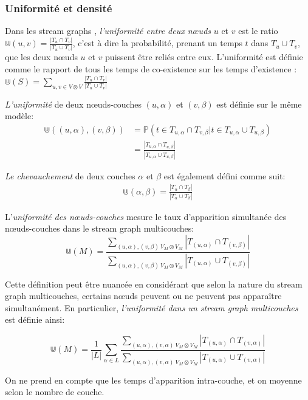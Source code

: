 \documentclass[11pt,a4paper]{article}
\theoremstyle{definition}
\theoremstyle{remark}
\theoremstyle{remark}
\def \stgm {stream graph multicouches}
\def \stgs {stream graphs}
\begin{document}
	\subsubsection{Uniformité et densité}
	
	Dans les \stgs{} \cite{stream}, {\em l'uniformité entre deux nœuds} $u$ et $v$ est le ratio $\Cup (u,v) = \frac{|T_u\cap T_v|}{|T_u \cup T_v|}$, c'est à dire la probabilité, prenant un temps $t$ dans $T_u\cup T_v$, que les deux nœuds $u$ et $v$ puissent être reliés entre eux. L'uniformité est définie comme le rapport de tous les temps de co-existence sur les temps d'existence : $
 \Cup(S)=\sum_{u,v \in V \otimes V}\frac{|T_u\cap T_v|}{|T_u\cup T_v|}
$
	
		
	{\em L'uniformité } de deux n\oe{}uds-couches $(u,\alpha)$ et $(v,\beta)$ est définie sur le même modèle:
	\begin{align*}
		\Cup((u,\alpha),(v,\beta)) &=\mathbb{P}( t \in T_{u,\alpha} \cap T_{v,\beta} | t \in T_{u,\alpha} \cup T_{u,\beta}) \\
		&= \frac{|T_{u,\alpha}\cap T_{u,\beta}|}{|T_{u,\alpha}\cup T_{u,\beta}|}
	\end{align*}

	{\em Le chevauchement} de deux couches $\alpha$ et $\beta$ est également défini comme suit:
	\begin{align*}
		\Cup(\alpha,\beta) = \frac{|T_{\alpha}\cap T_{\beta}|}{|T_{\alpha}\cup T_{\beta}|}
	\end{align*}

    L'{\em uniformité des n\oe{}uds-couches} mesure le taux d'apparition simultanée des n\oe{}uds-couches dans le \stgm{}:
    \[
    	\Cup(M) = \frac{\sum_{(u,\alpha),(v,\beta) \ V_M \otimes V_M}{|T_{(u,\alpha)} \cap T_{(v,\beta)}|}}{\sum_{(u,\alpha),(v,\beta) \ V_M \otimes V_M}{|T_{(u,\alpha)}\cup T_{(v,\beta)}|}}
    \]
	
	Cette définition peut être nuancée en considérant que selon la nature du \stgm{}, certains n\oe{}uds peuvent ou ne peuvent pas apparaître simultanément. En particulier, {\em l'uniformité dans un \stgm{}} est définie ainsi:	
	
	\[
    	\Cup(M) = \frac{1}{|L|}\sum_{\alpha \in L} \frac{\sum_{(u,\alpha),(v,\alpha) \ V_M \otimes V_M}{|T_{(u,\alpha)} \cap T_{(v,\alpha)}|}}{\sum_{(u,\alpha),(v,\alpha) \ V_M \otimes V_M}{|T_{(u,\alpha)}\cup T_{(v,\alpha)}|}}
    \]
    
    On ne prend en compte que les temps d'apparition intra-couche, et on moyenne selon le nombre de couche. 
\end{document}
